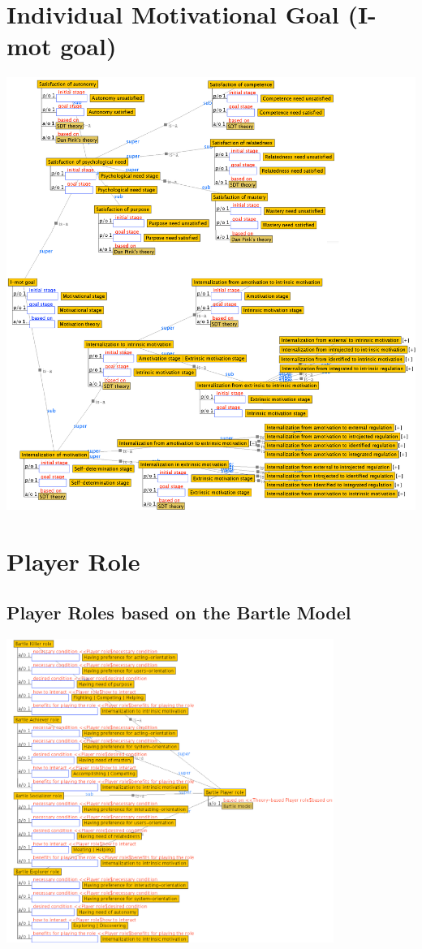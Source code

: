\section{Individual Motivational Goal (I-mot goal)}
\label{sec:ontogacles:i-mot-goal}
\includegraphics[width=1\textwidth]{images/appendix/ontological-structure-i-mot-goal.png}

\newpage
\section{Player Role}
\label{sec:ontogacles:player-role}

\subsection{Player Roles based on the Bartle Model}
\label{sec:player-roles-based-bartle}
\includegraphics[width=0.8\textwidth]{images/appendix/player-roles-based-bartle.png}

